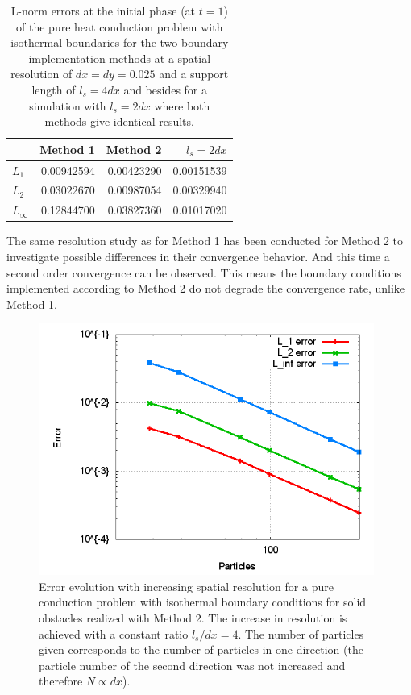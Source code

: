 \documentclass{report}
\begin{document}
 

\begin{table}[h] %
\label{tab:2DSPH_LinearWall_ThermalBC_Errors_supLen4dx}
\centering
\begin{tabular}[c]{||l||r|r|r||} %
\hline
\hline
 &{\bf Method 1} & {\bf Method 2} &{\bf $l_s=2dx$} \\
\hline
\hline
$L_1$&0.00942594 &  0.00423290&0.00151539  \\
\hline
$L_2$&0.03022670 & 0.00987054& 0.00329940 \\
\hline
$L_\infty$&0.12844700 & 0.03827360& 0.01017020 \\
\hline
\hline
\end{tabular}


\caption[]{L-norm errors at the initial phase (at $t=1$) of the pure heat conduction problem with isothermal boundaries for the two boundary implementation methods at a spatial resolution of $dx=dy=0.025$ and a support length of $l_s=4dx$ and besides for a simulation with $l_s=2dx$ where both methods give identical results.}
\end{table}


 The same resolution study as for Method 1 has been conducted for Method 2 to investigate possible differences in their convergence behavior. And this time a second order convergence can be observed. This means the boundary conditions  implemented according to Method 2 do not degrade the convergence rate, unlike Method 1.

\begin{figure}[!htbp]
\centering
\label{fig:SolObs_Thermal_BC2_ResolutionError}

\includegraphics[width=11cm]{Graphics/results/Porosities/LinearWall/ThermalBC2_Resolution/ErrorResolution}

\caption[Error resolution ]{Error evolution with increasing spatial resolution for a pure conduction problem with isothermal boundary conditions for solid obstacles realized with Method 2. The increase in resolution is achieved with a constant ratio $l_s/dx=4$.
The number of particles given corresponds to the number of particles in one direction (the particle number of the second direction was not increased and therefore $N \propto dx$).}

\end{figure}
\end{document}
